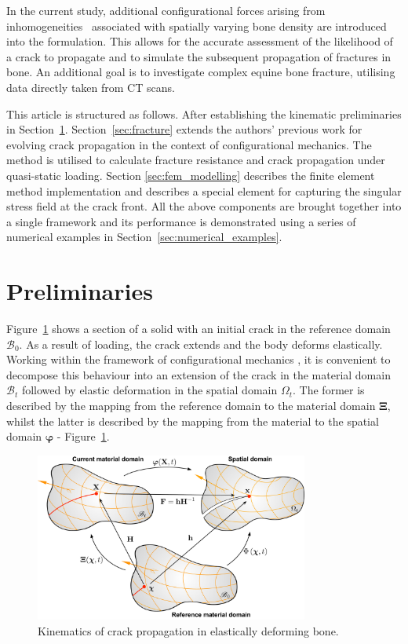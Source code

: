 \documentclass[onecolumn]{svjour3}
\begin{document}
In the current study, additional configurational forces arising from inhomogeneities~\cite{kienzler2014configurational}
associated with spatially varying bone density are introduced into the formulation. This allows for the accurate assessment of the likelihood of a crack to propagate and to simulate  the subsequent propagation of fractures in bone. 
An additional goal is to investigate complex equine bone fracture, utilising data directly taken from CT scans.  
% 

This article is structured as follows. After establishing the kinematic preliminaries in Section~\ref{preliminaries}. Section~\ref{sec:fracture} extends the authors' previous work for evolving crack propagation in the context of configurational mechanics. The method is utilised to calculate fracture resistance and crack propagation under quasi-static loading. Section \ref{sec:fem_modelling} describes the finite element method implementation and describes a special element for capturing the singular stress field at the crack front.  
All the above components are brought together into a single framework and its performance is demonstrated using a series of numerical examples in Section~\ref{sec:numerical_examples}.
% 
% 
\section{Preliminaries}
\label{preliminaries}
Figure~\ref{fig:domains4} shows a section of a solid with an initial crack in the reference domain $\mathscr{B}_{0}$. As a result of loading, the crack extends and the body deforms elastically. Working within the framework of configurational mechanics \cite{kaczmarczyk2014three,kienzler2014configurational}, it is convenient to decompose this behaviour into an extension of the crack in the material domain  $\mathscr{B}_t$ followed by elastic deformation in the spatial domain $\Omega_t$. The former is described by the mapping from the reference  domain to the material domain ${\boldsymbol\Xi}$, whilst the latter is described by the mapping from the material to the spatial domain ${\boldsymbol\varphi}$ - Figure~\ref{fig:domains4}.

\begin{figure}[th] 
\setlength{\fboxsep}{0pt}%
\setlength{\fboxrule}{0pt}%
\begin{center}
\includegraphics[width=9cm]{Figures/domains5.pdf} 
\end{center}
\caption{Kinematics of crack propagation in elastically deforming bone.}
\label{fig:domains4}
\end{figure}
\end{document}
